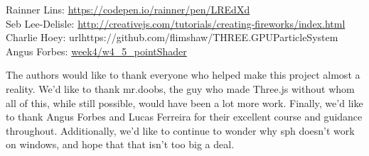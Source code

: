 Rainner Lins: \url{https://codepen.io/rainner/pen/LREdXd}\\

Seb Lee-Delisle: \url{http://creativejs.com/tutorials/creating-fireworks/index.html}\\

Charlie Hoey: url{https://github.com/flimshaw/THREE.GPUParticleSystem}\\

Angus Forbes: \url{week4/w4_5_pointShader}\\
\begin{acks}
 The authors would like to thank everyone who helped make this project almost a reality.
We'd like to thank mr.doobs, the guy who made Three.js without whom all of this, while still possible,
would have been a lot more work. Finally, we'd like to thank Angus Forbes and Lucas Ferreira for their
excellent course and guidance throughout. Additionally, we'd like to continue to wonder why sph doesn't work on windows, and hope that that isn't too big a deal.

\end{acks}
